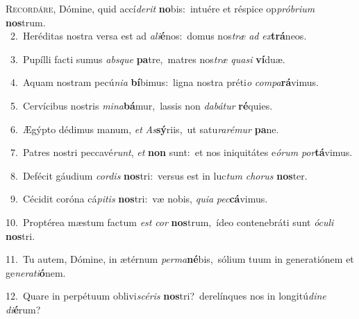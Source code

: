 \lettrine{\initial\textcolor{\initialcolor}{R}}{ecordáre,} Dómine, quid accí\-\textit{de}\-\textit{rit} \textbf{no}\-bis:~\star intuére et réspice op\-\textit{pró}\-\textit{bri}\textit{um} \textbf{nos}\-trum.\\
{\numbfont\textcolor{\numbcolor}{~2.}}~Heréditas nostra versa est ad \textit{a}\-\textit{li}\textbf{é}nos:~\star domus nos\textit{træ} \textit{ad} \textit{ex}\-\textbf{trá}neos.\par
{\numbfont\textcolor{\numbcolor}{~3.}}~Pupílli facti sumus \textit{abs}\-\textit{que} \textbf{pa}\-tre,~\star matres nos\textit{træ} \textit{qua}\-\textit{si} \textbf{ví}\-duæ.\par
{\numbfont\textcolor{\numbcolor}{~4.}}~Aquam nostram pecú\-\textit{ni}\-\textit{a} \textbf{bí}\-bimus:~\star ligna nostra préti\textit{o} \textit{com}\-\textit{pa}\textbf{rá}vimus.\par
{\numbfont\textcolor{\numbcolor}{~5.}}~Cervícibus nostris \textit{mi}\-\textit{na}\textbf{bá}mur,~\star lassis non \textit{da}\-\textit{bá}\textit{tur} \textbf{ré}\-quies.\par
{\numbfont\textcolor{\numbcolor}{~6.}}~Ægýpto dédimus manum, \textit{et} \textit{As}\-\textbf{sý}riis,~\star ut satu\-\textit{ra}\-\textit{ré}\textit{mur} \textbf{pa}\-ne.\par
{\numbfont\textcolor{\numbcolor}{~7.}}~Patres nostri peccavé\-\textit{runt}\-, \textit{et} \textbf{non} sunt:~\star et nos iniquitátes e\-\textit{ó}\-\textit{rum} \textit{por}\-\textbf{tá}vimus.\par
{\numbfont\textcolor{\numbcolor}{~8.}}~Defécit gáudium \textit{cor}\-\textit{dis} \textbf{nos}\-tri:~\star versus est in luc\textit{tum} \textit{cho}\-\textit{rus} \textbf{nos}\-ter.\par
{\numbfont\textcolor{\numbcolor}{~9.}}~Cécidit coróna cá\-\textit{pi}\-\textit{tis} \textbf{nos}\-tri:~\star væ nobis, \textit{qui}\-\textit{a} \textit{pec}\-\textbf{cá}vimus.\par
{\numbfont\textcolor{\numbcolor}{10.}}~Proptérea mæstum factum \textit{est} \textit{cor} \textbf{nos}\-trum,~\star ídeo contenebráti sunt \textit{ó}\-\textit{cu}\textit{li} \textbf{nos}\-tri.\par
{\numbfont\textcolor{\numbcolor}{11.}}~Tu autem, Dómine, in ætérnum \textit{per}\-\textit{ma}\textbf{né}bis,~\star sólium tuum in generatiónem et ge\-\textit{ne}\-\textit{ra}\textit{ti}\textbf{ó}nem.\par
{\numbfont\textcolor{\numbcolor}{12.}}~Quare in perpétuum oblivi\-\textit{scé}\-\textit{ris} \textbf{nos}\-tri?~\star derelínques nos in longitú\-\textit{di}\-\textit{ne} \textit{di}\-\textbf{é}rum?\par
